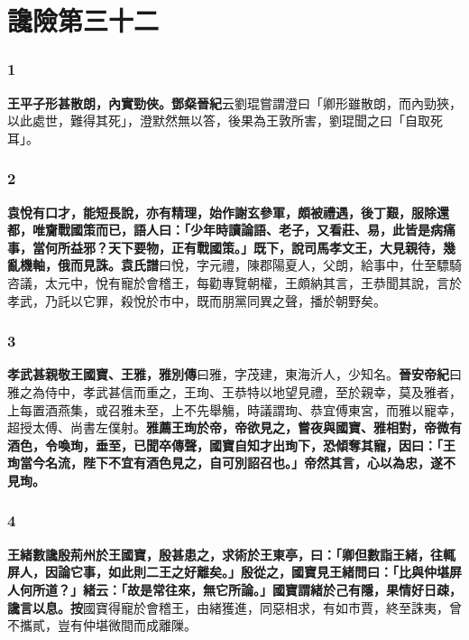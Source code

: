 \chapter{讒險第三十二}

\subsection*{1}

\textbf{王平子形甚散朗，內實勁俠。}{\footnotesize \textbf{鄧粲晉紀}云劉琨嘗謂澄曰「卿形雖散朗，而內勁狹，以此處世，難得其死」，澄默然無以答，後果為王敦所害，劉琨聞之曰「自取死耳」。}

\subsection*{2}

\textbf{袁悅有口才，能短長說，亦有精理，始作謝玄參軍，頗被禮遇，後丁艱，服除還都，唯齎戰國策而已，語人曰：「少年時讀論語、老子，又看莊、易，此皆是病痛事，當何所益邪？天下要物，正有戰國策。」既下，說司馬孝文王，大見親待，幾亂機軸，俄而見誅。}{\footnotesize \textbf{袁氏譜}曰悅，字元禮，陳郡陽夏人，父朗，給事中，仕至驃騎咨議，太元中，悅有寵於會稽王，每勸專覽朝權，王頗納其言，王恭聞其說，言於孝武，乃託以它罪，殺悅於市中，既而朋黨同異之聲，播於朝野矣。}

\subsection*{3}

\textbf{孝武甚親敬王國寶、王雅，}{\footnotesize \textbf{雅別傳}曰雅，字茂建，東海沂人，少知名。\textbf{晉安帝紀}曰雅之為侍中，孝武甚信而重之，王珣、王恭特以地望見禮，至於親幸，莫及雅者，上每置酒燕集，或召雅未至，上不先舉觴，時議謂珣、恭宜傅東宮，而雅以寵幸，超授太傅、尚書左僕射。}\textbf{雅薦王珣於帝，帝欲見之，嘗夜與國寶、雅相對，帝微有酒色，令喚珣，垂至，已聞卒傳聲，國寶自知才出珣下，恐傾奪其寵，因曰：「王珣當今名流，陛下不宜有酒色見之，自可別詔召也。」帝然其言，心以為忠，遂不見珣。}

\subsection*{4}

\textbf{王緒數讒殷荊州於王國寶，殷甚患之，求術於王東亭，曰：「卿但數詣王緒，往輒屏人，因論它事，如此則二王之好離矣。」殷從之，國寶見王緒問曰：「比與仲堪屏人何所道？」緒云：「故是常往來，無它所論。」國寶謂緒於己有隱，果情好日疎，讒言以息。}{\footnotesize \textbf{按}國寶得寵於會稽王，由緒獲進，同惡相求，有如市賈，終至誅夷，曾不攜貳，豈有仲堪微間而成離隟。}